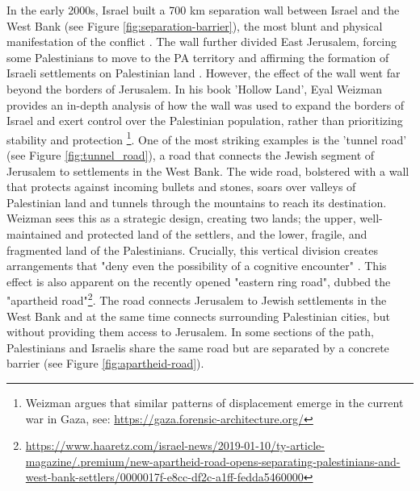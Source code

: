 \documentclass[dissertation,math,vertlayout,pdfa,colorlinks]{aaltoseries}
\begin{document}
In the early 2000s, Israel built a 700 km separation wall between Israel and the West Bank (see Figure \ref{fig:separation-barrier}), the most blunt and physical manifestation of the conflict \cite{weizmanHollowLandIsraels2012}. The wall further divided East Jerusalem, forcing some Palestinians to move to the PA territory and affirming the formation of Israeli settlements on Palestinian land \cite{kleinJerusalem2022}. However, the effect of the wall went far beyond the borders of Jerusalem. In his book 'Hollow Land', Eyal Weizman provides an in-depth analysis of how the wall was used to expand the borders of Israel and exert control over the Palestinian population, rather than prioritizing stability and protection \cite{weizmanHollowLandIsraels2012}\footnote{Weizman argues that similar patterns of displacement emerge in the current war in Gaza, see: \url{https://gaza.forensic-architecture.org/}}. One of the most striking examples is the 'tunnel road' \cite[p. 179]{weizmanHollowLandIsraels2012} (see Figure \ref{fig:tunnel_road}), a road that connects the Jewish segment of Jerusalem to settlements in the West Bank. The wide road, bolstered with a wall that protects against incoming bullets and stones, soars over valleys of Palestinian land and tunnels through the mountains to reach its destination. Weizman sees this as a strategic design, creating two lands; the upper, well-maintained and protected land of the settlers, and the lower, fragile, and fragmented land of the Palestinians. Crucially, this vertical division creates arrangements that "deny even the possibility of a cognitive encounter" \cite[p. 181]{weizmanHollowLandIsraels2012}. This effect is also apparent on the recently opened "eastern ring road", dubbed the "apartheid road"\footnote{\url{https://www.haaretz.com/israel-news/2019-01-10/ty-article-magazine/.premium/new-apartheid-road-opens-separating-palestinians-and-west-bank-settlers/0000017f-e8cc-df2c-a1ff-fedda5460000}}. The road connects Jerusalem to Jewish settlements in the West Bank and at the same time connects surrounding Palestinian cities, but without providing them access to Jerusalem. In some sections of the path, Palestinians and Israelis share the same road but are separated by a concrete barrier (see Figure \ref{fig:apartheid-road}).
\end{document}
